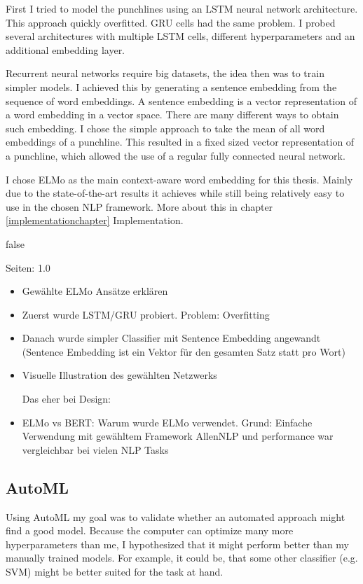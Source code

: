 \documentclass[draft,final,oneside]{vutinfth} %
\begin{document}
First I tried to model the punchlines using an LSTM neural network architecture. This approach quickly overfitted. GRU cells had the same problem. I probed several architectures with multiple LSTM cells, different hyperparameters and an additional embedding layer.

Recurrent neural networks require big datasets, the idea then was to train simpler models. I achieved this by generating a sentence embedding from the sequence of word embeddings. A sentence embedding is a vector representation of a word embedding in a vector space. There are many different ways to obtain such embedding. I chose the simple approach to take the mean of all word embeddings of a punchline. This resulted in a fixed sized vector representation of a punchline, which allowed the use of a regular fully connected neural network.

I chose ELMo as the main context-aware word embedding for this thesis. \cite{elmo} Mainly due to the state-of-the-art results it achieves while still being relatively easy to use in the chosen NLP framework. More about this in chapter \ref{implementationchapter} Implementation.


\if false

Seiten: 1.0

\begin{itemize}
\item Gewählte ELMo Ansätze erklären
\item Zuerst wurde LSTM/GRU probiert. Problem: Overfitting
\item Danach wurde simpler Classifier mit Sentence Embedding angewandt (Sentence Embedding ist ein Vektor für den gesamten Satz statt pro Wort)
\item Visuelle Illustration des gewählten Netzwerks

Das eher bei Design:
\item ELMo vs BERT: Warum wurde ELMo verwendet. Grund: Einfache Verwendung mit gewähltem Framework AllenNLP und performance war vergleichbar bei vielen NLP Tasks
\end{itemize}
\fi

\subsection{AutoML}

Using AutoML my goal was to validate whether an automated approach might find a good model. Because the computer can optimize many more hyperparameters than me, I hypothesized that it might perform better than my manually trained models. For example, it could be, that some other classifier (e.g. SVM) might be better suited for the task at hand.
\end{document}
